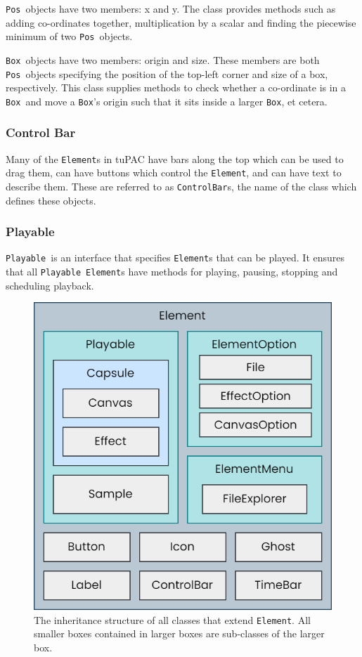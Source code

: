 \documentclass[12pt,a4paper,oneside,openright]{report}
\newcommand{\element}{\texttt{Element}}
\newcommand{\pos}{\texttt{Pos}}
\newcommand{\boxT}{\texttt{Box}}
\newcommand{\controlbar}{\texttt{ControlBar}}
\newcommand{\playable}{\texttt{Playable}}
\begin{document}
\pos\ objects have two members: x and y. The class provides methods such as adding co-ordinates together, multiplication by a scalar and finding the piecewise minimum of two \pos\ objects.

\boxT\ objects have two members: origin and size. These members are both \pos\ objects specifying the position of the top-left corner and size of a box, respectively. This class supplies methods to check whether a co-ordinate is in a \boxT\ and move a \boxT's origin such that it sits inside a larger \boxT, et cetera.

\subsubsection{Control Bar}
Many of the \element s in tuPAC have bars along the top which can be used to drag them, can have buttons which control the \element, and can have text to describe them. These are referred to as \controlbar s, the name of the class which defines these objects.

\subsubsection{Playable}
\playable\ is an interface that specifies \element s that can be played. It ensures that all \playable\ \element s have methods for playing, pausing, stopping and scheduling playback.

\begin{figure}[h]
    \centering
    \includegraphics[scale=0.4]{images/tupac_class_structure.png}
    \caption{The inheritance structure of all classes that extend \element. All smaller boxes contained in larger boxes are sub-classes of the larger box.}
    \label{fig:element_inheritance}
\end{figure}
\end{document}
